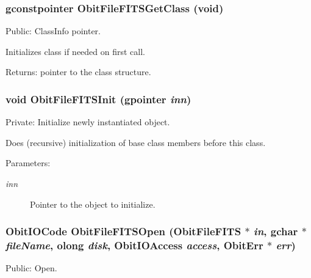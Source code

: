 \subsubsection{\setlength{\rightskip}{0pt plus 5cm}gconstpointer Obit\-File\-FITSGet\-Class (void)}\label{ObitFileFITS_8c_a8}


Public: Class\-Info pointer. 

Initializes class if needed on first call. \begin{Desc}
\item[Returns:]pointer to the class structure. \end{Desc}
\subsubsection{\setlength{\rightskip}{0pt plus 5cm}void Obit\-File\-FITSInit (gpointer {\em inn})}\label{ObitFileFITS_8c_a3}


Private: Initialize newly instantiated object. 

Does (recursive) initialization of base class members before this class. \begin{Desc}
\item[Parameters:]
\begin{description}
\item[{\em inn}]Pointer to the object to initialize. \end{description}
\end{Desc}
\subsubsection{\setlength{\rightskip}{0pt plus 5cm}Obit\-IOCode Obit\-File\-FITSOpen ({\bf Obit\-File\-FITS} $\ast$ {\em in}, gchar $\ast$ {\em file\-Name}, {\bf olong} {\em disk}, Obit\-IOAccess {\em access}, {\bf Obit\-Err} $\ast$ {\em err})}\label{ObitFileFITS_8c_a13}


Public: Open. 

